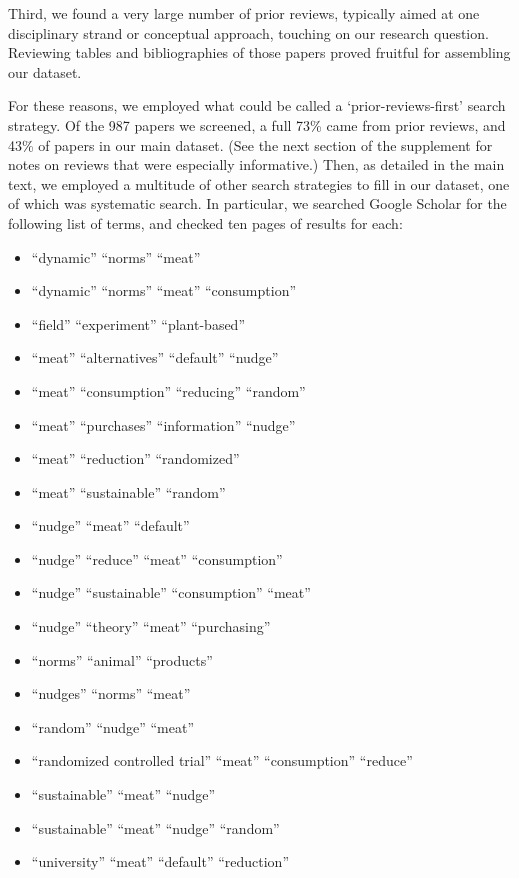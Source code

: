 \documentclass[preprint, 3p,
authoryear]{elsarticle} %
\providecommand{\tightlist}{%
  \setlength{\itemsep}{0pt}\setlength{\parskip}{0pt}}
\begin{document}
Third, we found a very large number of prior reviews, typically aimed at
one disciplinary strand or conceptual approach, touching on our research
question. Reviewing tables and bibliographies of those papers proved
fruitful for assembling our dataset.

For these reasons, we employed what could be called a
`prior-reviews-first' search strategy. Of the 987 papers we screened, a
full 73\% came from prior reviews, and 43\% of papers in our main
dataset. (See the next section of the supplement for notes on reviews
that were especially informative.) Then, as detailed in the main text,
we employed a multitude of other search strategies to fill in our
dataset, one of which was systematic search. In particular, we searched
Google Scholar for the following list of terms, and checked ten pages of
results for each:

\begin{itemize}
\tightlist
\item
  ``dynamic'' ``norms'' ``meat''
\item
  ``dynamic'' ``norms'' ``meat'' ``consumption''
\item
  ``field'' ``experiment'' ``plant-based''
\item
  ``meat'' ``alternatives'' ``default'' ``nudge''
\item
  ``meat'' ``consumption'' ``reducing'' ``random''
\item
  ``meat'' ``purchases'' ``information'' ``nudge''
\item
  ``meat'' ``reduction'' ``randomized''
\item
  ``meat'' ``sustainable'' ``random''
\item
  ``nudge'' ``meat'' ``default''
\item
  ``nudge'' ``reduce'' ``meat'' ``consumption''
\item
  ``nudge'' ``sustainable'' ``consumption'' ``meat''
\item
  ``nudge'' ``theory'' ``meat'' ``purchasing''
\item
  ``norms'' ``animal'' ``products''
\item
  ``nudges'' ``norms'' ``meat''
\item
  ``random'' ``nudge'' ``meat''
\item
  ``randomized controlled trial'' ``meat'' ``consumption'' ``reduce''
\item
  ``sustainable'' ``meat'' ``nudge''
\item
  ``sustainable'' ``meat'' ``nudge'' ``random''
\item
  ``university'' ``meat'' ``default'' ``reduction''
\end{itemize}
\end{document}
